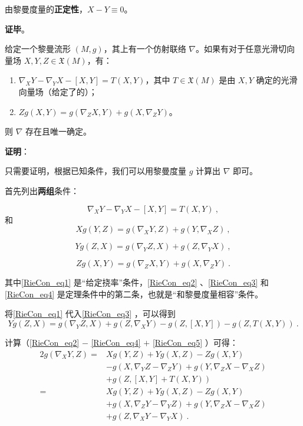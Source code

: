 由黎曼度量的\textbf{正定性}，$X-Y\equiv 0$。

\textbf{证毕}。






\begin{theorem}{}\label{RieCon_the1}
给定一个黎曼流形 $(M, g)$，其上有一个仿射联络 $\nabla$。如果有对于任意光滑切向量场 $X, Y, Z\in\mathfrak{X}(M)$，有：
\begin{enumerate}
\item $\nabla_XY-\nabla_YX-[X, Y]=T(X, Y)$，其中 $T\in \mathfrak{X}(M)$ 是由 $X, Y$ 确定的光滑向量场（给定了的）；
\item $Zg(X, Y)=g(\nabla_ZX, Y)+g(X, \nabla_ZY)$。
\end{enumerate}
则 $\nabla$ 存在且唯一确定。
\end{theorem}

\textbf{证明}：

只需要证明，根据已知条件，我们可以用黎曼度量 $g$ 计算出 $\nabla$ 即可。

首先列出\textbf{两组}条件：

\begin{equation}\label{RieCon_eq1}
\nabla_XY-\nabla_YX-[X, Y]=T(X, Y)~,
\end{equation}
和
\begin{equation}\label{RieCon_eq2}
Xg(Y, Z)=g(\nabla_XY, Z)+g(Y, \nabla_XZ)~,
\end{equation}

\begin{equation}\label{RieCon_eq3}
Yg(Z, X)=g(\nabla_YZ, X)+g(Z, \nabla_YX)~,
\end{equation}

\begin{equation}\label{RieCon_eq4}
Zg(X, Y)=g(\nabla_ZX, Y)+g(X, \nabla_ZY)~.
\end{equation}


其中\autoref{RieCon_eq1} 是“给定挠率”条件，\autoref{RieCon_eq2} 、\autoref{RieCon_eq3} 和\autoref{RieCon_eq4} 是定理条件中的第二条，也就是“和黎曼度量相容”条件。

将\autoref{RieCon_eq1} 代入\autoref{RieCon_eq3} ，可以得到
\begin{equation}\label{RieCon_eq5}
Yg(Z, X)=g(\nabla_YZ, X)+g(Z, \nabla_XY)-g(Z, [X, Y])-g(Z, T(X, Y))~.
\end{equation}

计算（\autoref{RieCon_eq2} $-$ \autoref{RieCon_eq4} $+$ \autoref{RieCon_eq5} ）可得：
\begin{equation}\label{RieCon_eq6}
\begin{aligned}
2g(\nabla_XY, Z)=&Xg(Y, Z)+Yg(X, Z)-Zg(X, Y)\\&-g(X, \nabla_YZ-\nabla_ZY)+g(Y, \nabla_ZX-\nabla_XZ)\\&+g(Z, [X, Y]+T(X, Y))\\
=&Xg(Y, Z)+Yg(X, Z)-Zg(X, Y)\\&+g(X, \nabla_ZY-\nabla_YZ)+g(Y, \nabla_ZX-\nabla_XZ)\\&+g(Z, \nabla_XY-\nabla_YX)~.
\end{aligned}
\end{equation}


